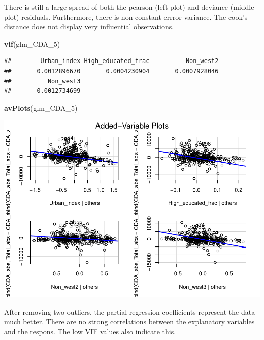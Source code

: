 \documentclass[11pt,]{article}
\newenvironment{Shaded}{\begin{snugshade}}{\end{snugshade}}
\newcommand{\KeywordTok}[1]{\textcolor[rgb]{0.13,0.29,0.53}{\textbf{#1}}}
\newcommand{\DecValTok}[1]{\textcolor[rgb]{0.00,0.00,0.81}{#1}}
\newcommand{\NormalTok}[1]{#1}
\begin{document}
There is still a large spread of both the pearson (left plot) and
deviance (middle plot) residuals. Furthermore, there is non-constant
errror variance. The cook's distance does not display very influential
observations.

\begin{Shaded}
\begin{Highlighting}[]
\KeywordTok{vif}\NormalTok{(glm_CDA_}\DecValTok{5}\NormalTok{)}
\end{Highlighting}
\end{Shaded}

\begin{verbatim}
##        Urban_index High_educated_frac          Non_west2 
##       0.0012896670       0.0004230904       0.0007928046 
##          Non_west3 
##       0.0012734699
\end{verbatim}

\begin{Shaded}
\begin{Highlighting}[]
\KeywordTok{avPlots}\NormalTok{(glm_CDA_}\DecValTok{5}\NormalTok{)}
\end{Highlighting}
\end{Shaded}

\begin{center}\includegraphics{Report_files/figure-latex/unnamed-chunk-26-1} \end{center}

After removing two outliers, the partial regression coefficients
represent the data much better. There are no strong correlations between
the explanatory variables and the respons. The low VIF values also
indicate this.
\end{document}
